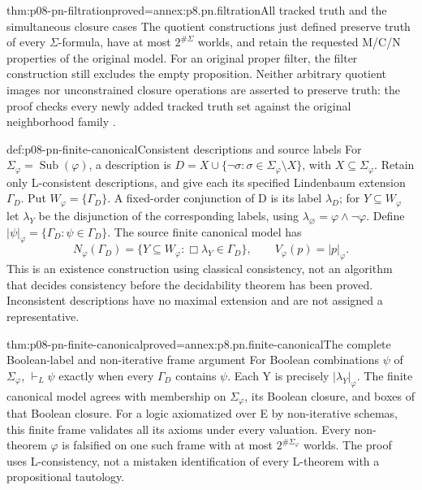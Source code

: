 \begin{hbtheorem}{thm:p08-pn-filtration}{proved=annex:p8.pn.filtration}{All tracked truth and the simultaneous closure cases}
The quotient constructions just defined preserve truth of every
\(\Sigma\)-formula, have at most \(2^{\#\Sigma}\) worlds,
and retain the requested M/C/N properties of the original model.
For an original proper filter, the filter construction still
excludes the empty proposition. Neither arbitrary quotient
images nor unconstrained closure operations are asserted to
preserve truth: the proof checks every newly added tracked
truth set against the original neighborhood family
\cite[thm.~2.47, lemma~2.17, ex.~2.23]{Pacuit2017}.
\end{hbtheorem}

\begin{hbdefinition}{def:p08-pn-finite-canonical}{Consistent descriptions and source labels}
For \(\Sigma_\varphi=\operatorname{Sub}(\varphi)\), a
description is \(D=X\cup\{\neg\sigma:
\sigma\in\Sigma_\varphi\setminus X\}\), with
\(X\subseteq\Sigma_\varphi\). Retain only L-consistent
descriptions, and give each its specified Lindenbaum extension
\(\Gamma_D\). Put \(W_\varphi=\{\Gamma_D\}\).
A fixed-order conjunction of D is its label \(\lambda_D\);
for \(Y\subseteq W_\varphi\) let \(\lambda_Y\) be the
disjunction of the corresponding labels, using
\(\lambda_\varnothing=\varphi\land\neg\varphi\).
Define \(|\psi|_\varphi=\{\Gamma_D:\psi\in\Gamma_D\}\).
The source finite canonical model has
\[
 N_\varphi(\Gamma_D)=\{Y\subseteq W_\varphi:
                         \Box\lambda_Y\in\Gamma_D\},\qquad
 V_\varphi(p)=|p|_\varphi.
\]
This is an existence construction using classical consistency,
not an algorithm that decides consistency before the decidability
theorem has been proved. Inconsistent descriptions have no
maximal extension and are not assigned a representative.
\end{hbdefinition}

\begin{hbtheorem}{thm:p08-pn-finite-canonical}{proved=annex:p8.pn.finite-canonical}{The complete Boolean-label and non-iterative frame argument}
For Boolean combinations \(\psi\) of \(\Sigma_\varphi\),
\(\vdash_L\psi\) exactly when every \(\Gamma_D\) contains
\(\psi\). Each Y is precisely \(|\lambda_Y|_\varphi\).
The finite canonical model agrees with membership on
\(\Sigma_\varphi\), its Boolean closure, and boxes of that
Boolean closure. For a logic axiomatized over E by non-iterative
schemas, this finite frame validates all its axioms under every
valuation. Every non-theorem \(\varphi\) is falsified on one
such frame with at most \(2^{\#\Sigma_\varphi}\) worlds.
The proof uses L-consistency, not a mistaken identification
of every L-theorem with a propositional tautology.
\end{hbtheorem}

